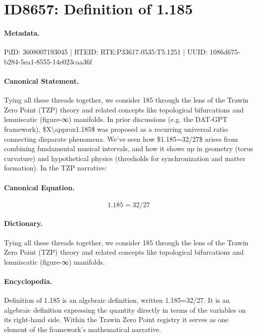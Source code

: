 \section*{ID8657: Definition of 1.185}
\paragraph{Metadata.}
PiID: 3608007193045 | RTEID: RTE:P33617.0535:T5.1251 | UUID: 1086d675-b284-5ea1-8555-14e023caa36f

\paragraph{Canonical Statement.}
Tying all these threads together, we consider 185 through the lens of the Trawin Zero Point (TZP) theory and related concepts like topological bifurcations and lemniscatic (figure-∞) manifolds. In prior discussions (e.g. the DAT-GPT framework), \$X\textbackslash{}approx1.185\$ was proposed as a recurring universal ratio connecting disparate phenomena. We've seen how \$1.185=32/27\$ arises from combining fundamental musical intervals, and how it shows up in geometry (torus curvature) and hypothetical physics (thresholds for synchronization and matter formation). In the TZP narrative:

\paragraph{Canonical Equation.}
\[
1.185=32/27
\]

\paragraph{Dictionary.}
Tying all these threads together, we consider 185 through the lens of the Trawin Zero Point (TZP) theory and related concepts like topological bifurcations and lemniscatic (figure-∞) manifolds.

\paragraph{Encyclopedia.}
Definition of 1.185 is an algebraic definition, written 1.185=32/27. It is an algebraic definition expressing the quantity directly in terms of the variables on its right-hand side. Within the Trawin Zero Point registry it serves as one element of the framework's mathematical narrative.

